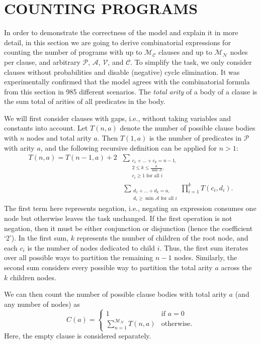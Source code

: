 \documentclass[letterpaper]{article}
\theoremstyle{definition}
\newcommand{\predicates}{\mathcal{P}}
\newcommand{\variables}{\mathcal{V}}
\newcommand{\constants}{\mathcal{C}}
\newcommand{\arities}{\mathcal{A}}
\newcommand{\maxNumNodes}{\mathcal{M}_{\mathcal{N}}}
\newcommand{\maxNumClauses}{\mathcal{M}_{\mathcal{C}}}
\begin{document}
\section{COUNTING PROGRAMS}

In order to demonstrate the correctness of the model and explain it in more
detail, in this section we are going to derive combinatorial expressions for
counting the number of programs with up to $\maxNumClauses{}$ clauses and up to
$\maxNumNodes{}$ nodes per clause, and arbitrary $\predicates{}$,
$\arities{}$, $\variables{}$, and $\constants{}$. To simplify the task, we only
consider clauses without probabilities and disable (negative) cycle elimination.
It was experimentally confirmed that the model agrees with the combinatorial
formula from this section in 985 different scenarios. The \emph{total arity} of
a body of a clause is the sum total of arities of all predicates in the body.

We will first consider clauses with gaps, i.e., without taking variables and
constants into account. Let $T(n, a)$ denote the number of possible clause
bodies with $n$ nodes and total arity $a$. Then $T(1, a)$ is the number of
predicates in $\predicates{}$ with arity $a$, and the following recursive
definition can be applied for $n > 1$:
\begin{align*}
  T(n, a) = T(n-1, a) + 2&\sum_{\substack{c_1 + \dots + c_k = n - 1,\\
      2 \le k \le \frac{a}{\min \arities{}},\\
  c_i \ge 1 \text{ for all } i}}\\
  &\sum_{\substack{d_1 + \dots + d_k = a,\\
  d_i \ge \min \arities{} \text{ for all } i}} \prod_{i=1}^k T(c_i, d_i).
\end{align*}
The first term here represents negation, i.e., negating an expression consumes
one node but otherwise leaves the task unchanged. If the first operation is not
negation, then it must be either conjunction or disjunction (hence the
coefficient `2'). In the first sum, $k$ represents the number of children of the
root node, and each $c_i$ is the number of nodes dedicated to child $i$. Thus,
the first sum iterates over all possible ways to partition the remaining $n-1$
nodes. Similarly, the second sum considers every possible way to partition the
total arity $a$ across the $k$ children nodes.

We can then count the number of possible clause bodies with total arity $a$ (and
any number of nodes) as
\[
  C(a) = \begin{cases}
    1 & \text{if } a = 0\\
    \sum_{n=1}^{\maxNumNodes{}} T(n, a) & \text{otherwise.}
  \end{cases}
\]
Here, the empty clause is considered separately.
\end{document}

